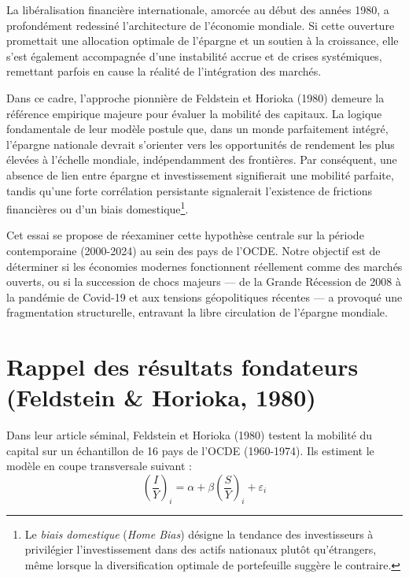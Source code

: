 \documentclass[12pt, a4paper]{article}
\begin{document}
La libéralisation financière internationale, amorcée au début des années 1980, a profondément redessiné l'architecture de l'économie mondiale. Si cette ouverture promettait une allocation optimale de l'épargne et un soutien à la croissance, elle s'est également accompagnée d'une instabilité accrue et de crises systémiques, remettant parfois en cause la réalité de l'intégration des marchés.

Dans ce cadre, l'approche pionnière de Feldstein et Horioka (1980) demeure la référence empirique majeure pour évaluer la mobilité des capitaux. La logique fondamentale de leur modèle postule que, dans un monde parfaitement intégré, l'épargne nationale devrait s'orienter vers les opportunités de rendement les plus élevées à l'échelle mondiale, indépendamment des frontières. Par conséquent, une absence de lien entre épargne et investissement signifierait une mobilité parfaite, tandis qu'une forte corrélation persistante signalerait l'existence de frictions financières ou d'un biais domestique\footnote{Le \textit{biais domestique} (\textit{Home Bias}) désigne la tendance des investisseurs à privilégier l'investissement dans des actifs nationaux plutôt qu'étrangers, même lorsque la diversification optimale de portefeuille suggère le contraire.}.

Cet essai se propose de réexaminer cette hypothèse centrale sur la période contemporaine (2000-2024) au sein des pays de l'OCDE. Notre objectif est de déterminer si les économies modernes fonctionnent réellement comme des marchés ouverts, ou si la succession de chocs majeurs — de la Grande Récession de 2008 à la pandémie de Covid-19 et aux tensions géopolitiques récentes — a provoqué une fragmentation structurelle, entravant la libre circulation de l'épargne mondiale.
\section{Rappel des résultats fondateurs (Feldstein \& Horioka, 1980)}

Dans leur article séminal, Feldstein et Horioka (1980) testent la mobilité du capital sur un échantillon de 16 pays de l'OCDE (1960-1974). Ils estiment le modèle en coupe transversale suivant :
\begin{equation}
\label{eq:FH1980}
\left(\frac{I}{Y}\right)_i = \alpha + \beta \left(\frac{S}{Y}\right)_i + \varepsilon_i
\end{equation}
\end{document}

